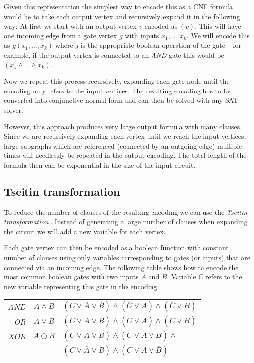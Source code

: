 Given this representation the simplest way to encode this as a CNF formula would be to take each output vertex and recursively expand it in the following way:
At first we start with an output vertex $v$ encoded as $(v)$.
This will have one incoming edge from a gate vertex $g$ with inputs $x_1, \dots, x_k$.
We will encode this as $g(x_1, \dots, x_k)$ where $g$ is the appropriate boolean operation of the gate -- for example, if the output vertex is connected to an \emph{AND} gate this would be $(x_1 \land \dots \land x_k)$.

Now we repeat this process recursively, expanding each gate node until the encoding only refers to the input vertices.
The resulting encoding has to be converted into conjunctive normal form and can then be solved with any SAT solver.

However, this approach produces very large output formula with many clauses.
Since we are recursively expanding each vertex until we reach the input vertices, large subgraphs which are referenced (connected by an outgoing edge) multiple times will needlessly be repeated in the output encoding.
The total length of the formula then can be exponential in the size of the input circuit.

\subsection{Tseitin transformation}
\label{sec:tseitin}
To reduce the number of clauses of the resulting encoding we can use the \emph{Tseitin transformation} \cite{tseitin1983complexity}.
Instead of generating a large number of clauses when expanding the circuit we will add a new variable for each vertex.

Each gate vertex can then be encoded as a boolean function with constant number of clauses using only variables corresponding to gates (or inputs) that are connected via an incoming edge.
The following table shows how to encode the most common boolean gates with two inputs $A$ and $B$.
Variable $C$ refers to the new variable representing this gate in the encoding.

\begin{tabular}{r c l}
\emph{AND}& $A\land B$ & $(C \lor \overline{A} \lor \overline{B}) \land (\overline{C} \lor A) \land (\overline{C} \lor B)$ \\
\emph{OR} & $A\lor B$ & $(\overline{C} \lor A \lor B) \land (C \lor \overline{A}) \land (C \lor \overline{B})$ \\
\emph{XOR} & $A\oplus B$ & $(\overline{C} \lor \overline{A} \lor \overline{B}) \land (\overline{C} \lor A \lor B) \land$\\
& & $(C \lor \overline{A} \lor B) \land (C \lor A \lor \overline{B})$
\end{tabular}


